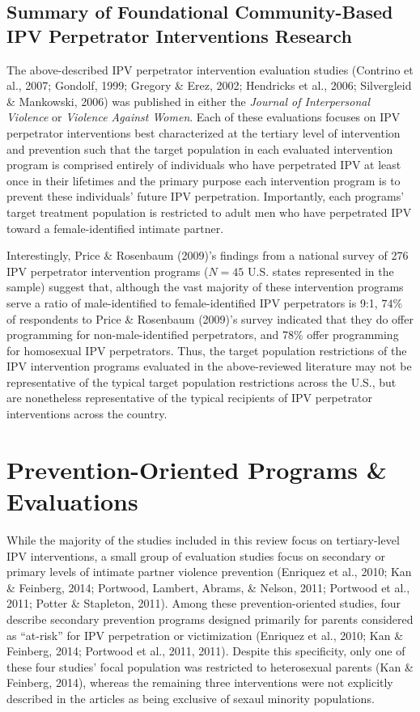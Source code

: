 \documentclass[11pt,]{tufte-book}
\begin{document}
\section{Summary of Foundational Community-Based IPV Perpetrator
Interventions
Research}\label{summary-of-foundational-community-based-ipv-perpetrator-interventions-research}

The above-described IPV perpetrator intervention evaluation studies
(Contrino et al., 2007; Gondolf, 1999; Gregory \& Erez, 2002; Hendricks
et al., 2006; Silvergleid \& Mankowski, 2006) was published in either
the \emph{Journal of Interpersonal Violence} or \emph{Violence Against
Women}. Each of these evaluations focuses on IPV perpetrator
interventions best characterized at the tertiary level of intervention
and prevention such that the target population in each evaluated
intervention program is comprised entirely of individuals who have
perpetrated IPV at least once in their lifetimes and the primary purpose
each intervention program is to prevent these individuals' future IPV
perpetration. Importantly, each programs' target treatment population is
restricted to adult men who have perpetrated IPV toward a
female-identified intimate partner.

Interestingly, Price \& Rosenbaum (2009)'s findings from a national
survey of 276 IPV perpetrator intervention programs (\(N = 45\) U.S.
states represented in the sample) suggest that, although the vast
majority of these intervention programs serve a ratio of male-identified
to female-identified IPV perpetrators is 9:1, \(74\%\) of respondents to
Price \& Rosenbaum (2009)'s survey indicated that they do offer
programming for non-male-identified perpetrators, and 78\% offer
programming for homosexual IPV perpetrators. Thus, the target population
restrictions of the IPV intervention programs evaluated in the
above-reviewed literature may not be representative of the typical
target population restrictions across the U.S., but are nonetheless
representative of the typical recipients of IPV perpetrator
interventions across the country.

\chapter{Prevention-Oriented Programs \&
Evaluations}\label{prevention-oriented-programs-evaluations}

While the majority of the studies included in this review focus on
tertiary-level IPV interventions, a small group of evaluation studies
focus on secondary or primary levels of intimate partner violence
prevention (Enriquez et al., 2010; Kan \& Feinberg, 2014; Portwood,
Lambert, Abrams, \& Nelson, 2011; Portwood et al., 2011; Potter \&
Stapleton, 2011). Among these prevention-oriented studies, four describe
secondary prevention programs designed primarily for parents considered
as ``at-risk'' for IPV perpetration or victimization (Enriquez et al.,
2010; Kan \& Feinberg, 2014; Portwood et al., 2011, 2011). Despite this
specificity, only one of these four studies' focal population was
restricted to heterosexual parents (Kan \& Feinberg, 2014), whereas the
remaining three interventions were not explicitly described in the
articles as being exclusive of sexaul minority populations.
\end{document}

